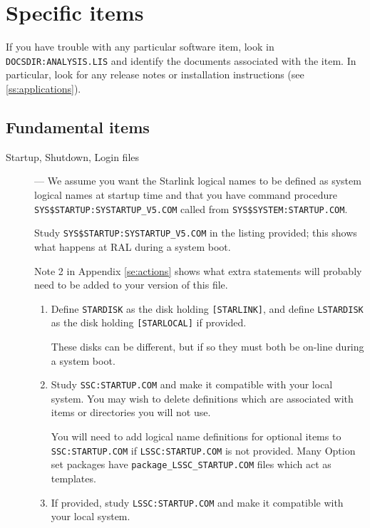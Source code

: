 \section {Specific items}
\label{se:specific}

If you have trouble with any particular software item, look in {\tt
DOCSDIR:\-ANALYSIS.\-LIS} and identify the documents associated with the item.
In particular, look for any release notes or installation instructions (see
\ref{ss:applications}).

\subsection{Fundamental items}
\label{ss:fundamental}

\begin{description}

\item [Startup, Shutdown, Login files] --- We assume you want the Starlink
logical names to be defined as system logical names at startup time and that
you have command procedure {\tt SYS\$STARTUP:SYSTARTUP\_V5.COM} called from
{\tt SYS\$\-SYSTEM:\-STARTUP.\-COM}.

Study {\tt SYS\$STARTUP:SYSTARTUP\_V5.COM} in the listing provided; this shows
what happens at RAL during a system boot.

Note 2 in Appendix \ref{se:actions} shows what extra statements will probably
need to be added to your version of this file.

\begin{enumerate}
\item Define {\tt STARDISK} as the disk holding {\tt [STARLINK]},
and define {\tt LSTARDISK} as the disk holding {\tt [STARLOCAL]} if provided.

These disks can be different, but if so they must both be on-line during a
system boot.

\item Study {\tt SSC:STARTUP.COM} and make it compatible with your local system.
You may wish to delete definitions which are associated with items or
directories you will not use.

You will need to add logical name definitions for optional items to {\tt
SSC:STARTUP.COM} if {\tt LSSC:STARTUP.COM} is not provided. Many Option set
packages have {\tt package\_LSSC\-\_STARTUP.COM} files which act as templates.

\item If provided, study {\tt LSSC:STARTUP.COM} and make it compatible with
your local system.


\end{enumerate}
\end{description}
